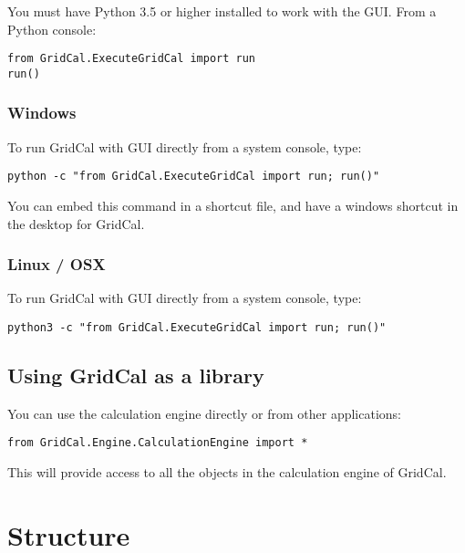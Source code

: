 \documentclass[11pt,fleqn]{book} %
\begin{document}
You must have Python 3.5 or higher installed to work with the GUI. From a Python console:

\begin{verbatim}
from GridCal.ExecuteGridCal import run
run()
\end{verbatim}

\subsection{Windows}

To run GridCal with GUI directly from a system console, type:\newline

\verb|python -c "from GridCal.ExecuteGridCal import run; run()"|\newline

You can embed this command in a shortcut file, and have a windows shortcut in the desktop for GridCal.

\subsection{Linux / OSX}

To run GridCal with GUI directly from a system console, type:\newline

\verb|python3 -c "from GridCal.ExecuteGridCal import run; run()"|\newline



\section{Using GridCal as a library}

You can use the calculation engine directly or from other applications: \newline

\verb|from GridCal.Engine.CalculationEngine import *| \newline

This will provide access to all the objects in the calculation engine of GridCal.



\chapter{Structure}
\end{document}
